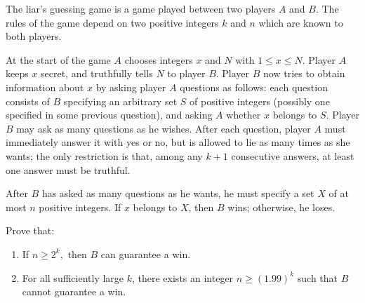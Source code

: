The liar's guessing game is a game played between two players $A$ and $B$. The rules of the game depend on two positive integers $k$ and $n$ which are known to both players.

At the start of the game $A$ chooses integers $x$ and $N$ with $1 \le x \le N.$ Player $A$ keeps $x$ secret, and truthfully tells $N$ to player $B$. Player $B$ now tries to obtain information about $x$ by asking player $A$ questions as follows: each question consists of $B$ specifying an arbitrary set $S$ of positive integers (possibly one specified in some previous question), and asking $A$ whether $x$ belongs to $S$. Player $B$ may ask as many questions as he wishes. After each question, player $A$ must immediately answer it with yes or no, but is allowed to lie as many times as she wants; the only restriction is that, among any $k+1$ consecutive answers, at least one answer must be truthful.

After $B$ has asked as many questions as he wants, he must specify a set $X$ of at most $n$ positive integers. If $x$ belongs to $X$,  then $B$ wins; otherwise, he loses.

Prove that:

\begin{enumerate}[label = (\alph*)]
	\item If $n \ge 2^k,$ then $B$ can guarantee a win.
	\item For all sufficiently large $k$,  there exists an integer $n \ge (1.99)^k$ such that $B$ cannot guarantee a win.
\end{enumerate}
